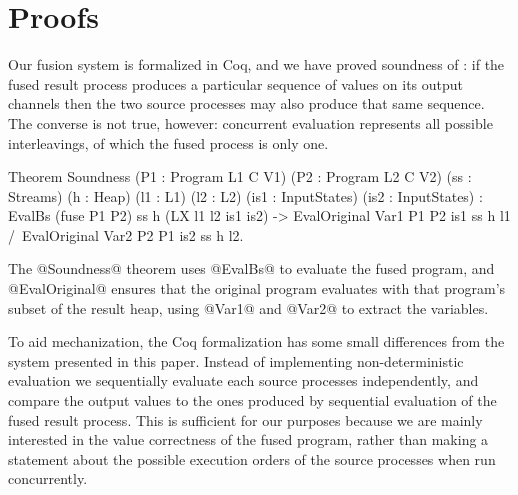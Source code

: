 
\section{Proofs}
\label{s:Proofs}

Our fusion system is formalized in Coq, and we have proved soundness of : if the fused result process produces a particular sequence of values on its output channels then the two source processes may also produce that same sequence. The converse is not true, however: concurrent evaluation represents all possible interleavings, of which the fused process is only one.


\begin{code}
Theorem Soundness 
  (P1 : Program L1 C V1) (P2 : Program L2 C V2)
  (ss : Streams) (h : Heap) (l1 : L1) (l2 : L2)
  (is1 : InputStates) (is2 : InputStates) 
  :  EvalBs (fuse P1 P2) ss h (LX l1 l2 is1 is2)
  -> EvalOriginal Var1 P1 P2 is1 ss h l1
  /\ EvalOriginal Var2 P2 P1 is2 ss h l2.
\end{code}

The @Soundness@ theorem uses @EvalBs@ to evaluate the fused program, and @EvalOriginal@ ensures that the original program evaluates with that program's subset of the result heap, using @Var1@ and @Var2@ to extract the variables.


To aid mechanization, the Coq formalization has some small differences from the system presented in this paper. Instead of implementing non-deterministic evaluation we sequentially evaluate each source processes independently, and compare the output values to the ones produced by sequential evaluation of the fused result process. This is sufficient for our purposes because we are mainly interested in the value correctness of the fused program, rather than making a statement about the possible execution orders of the source processes when run concurrently.


